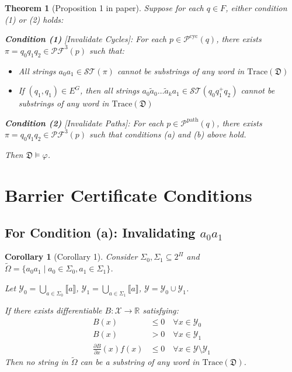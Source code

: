 \documentclass{article}
\newtheorem{theorem}{Theorem}
\newtheorem{corollary}{Corollary}
\begin{document}
\begin{theorem}[Proposition 1 in paper]
Suppose for each $q \in F$, either condition (1) or (2) holds:

\textbf{Condition (1)} [Invalidate Cycles]: For each $p \in \mathcal{P}^{\text{cyc}}(q)$, there exists $\pi = q_0 q_1 q_2 \in \mathcal{PF}^3(p)$ such that:
\begin{itemize}
    \item[(a)] All strings $a_0 a_1 \in \mathcal{ST}(\pi)$ cannot be substrings of any word in $\text{Trace}(\mathfrak{D})$
    \item[(b)] If $(q_1, q_1) \in E^G$, then all strings $a_0 \tilde{a}_0 \ldots \tilde{a}_k a_1 \in \mathcal{ST}(q_0 q_1^+ q_2)$ cannot be substrings of any word in $\text{Trace}(\mathfrak{D})$
\end{itemize}

\textbf{Condition (2)} [Invalidate Paths]: For each $p \in \mathcal{P}^{\text{path}}(q)$, there exists $\pi = q_0 q_1 q_2 \in \mathcal{PF}^3(p)$ such that conditions (a) and (b) above hold.

Then $\mathfrak{D} \models \varphi$.
\end{theorem}

\section{Barrier Certificate Conditions}

\subsection{For Condition (a): Invalidating $a_0 a_1$}

\begin{corollary}[Corollary 1]
Consider $\Sigma_0, \Sigma_1 \subseteq 2^\Pi$ and $\tilde{\Omega} = \{a_0 a_1 \mid a_0 \in \Sigma_0, a_1 \in \Sigma_1\}$.

Let $\mathcal{Y}_0 = \bigcup_{a \in \Sigma_0} \llbracket a \rrbracket$, $\mathcal{Y}_1 = \bigcup_{a \in \Sigma_1} \llbracket a \rrbracket$, $\mathcal{Y} = \mathcal{Y}_0 \cup \mathcal{Y}_1$.

If there exists differentiable $B: \mathcal{X} \to \mathbb{R}$ satisfying:
\begin{align}
B(x) &\leq 0 \quad \forall x \in \mathcal{Y}_0\\
B(x) &> 0 \quad \forall x \in \mathcal{Y}_1\\
\frac{\partial B}{\partial x}(x) f(x) &\leq 0 \quad \forall x \in \mathcal{Y} \setminus \mathcal{Y}_1
\end{align}
Then no string in $\tilde{\Omega}$ can be a substring of any word in $\text{Trace}(\mathfrak{D})$.
\end{corollary}
\end{document}
